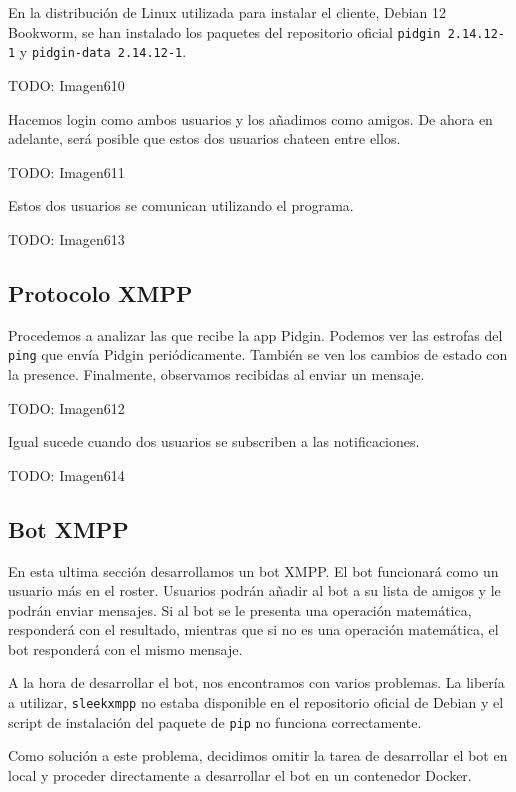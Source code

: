 En la distribución de Linux utilizada para instalar el cliente, Debian 12 Bookworm,
se han instalado los paquetes del repositorio oficial 
\lstinline{pidgin 2.14.12-1} y \lstinline{pidgin-data 2.14.12-1}.

TODO: Imagen610

Hacemos login como ambos usuarios y los añadimos como amigos.
De ahora en adelante, será posible que estos dos usuarios chateen entre ellos.

TODO: Imagen611

Estos dos usuarios se comunican utilizando el programa.

TODO: Imagen613

\subsection{Protocolo XMPP}

Procedemos a analizar las  que recibe la app Pidgin.
Podemos ver las estrofas del \lstinline{ping} que envía Pidgin periódicamente.
También se ven los cambios de estado con la  presence.
Finalmente, observamos  recibidas al enviar un mensaje.

TODO: Imagen612

Igual sucede cuando dos usuarios se subscriben a las notificaciones.

TODO: Imagen614

\subsection{Bot XMPP}

En esta ultima sección desarrollamos un bot XMPP.
El bot funcionará como un usuario más en el roster.
Usuarios podrán añadir al bot a su lista de amigos y le podrán enviar mensajes.
Si al bot se le presenta una operación matemática, responderá con el resultado,
mientras que si no es una operación matemática, el bot responderá con el mismo mensaje.

A la hora de desarrollar el bot, nos encontramos con varios problemas.
La libería a utilizar, \lstinline{sleekxmpp} no estaba disponible en el repositorio
oficial de Debian y el script de instalación del paquete de \lstinline{pip} no funciona correctamente.

Como solución a este problema, decidimos omitir la tarea de desarrollar el bot en local
y proceder directamente a desarrollar el bot en un contenedor Docker.

